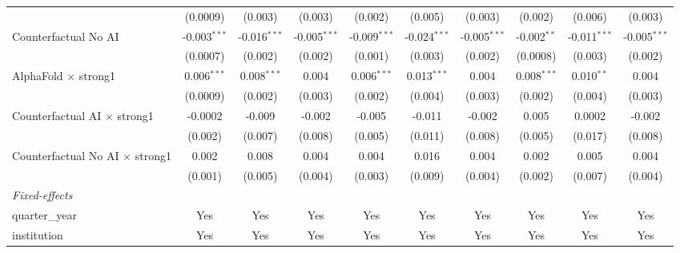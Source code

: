 \begin{tabular}{lccccccccc}
                                          & (0.0009)       & (0.003)        & (0.003)        & (0.002)        & (0.005)        & (0.003)        & (0.002)       & (0.006)        & (0.003)\\   
   Counterfactual No AI                   & -0.003$^{***}$ & -0.016$^{***}$ & -0.005$^{***}$ & -0.009$^{***}$ & -0.024$^{***}$ & -0.005$^{***}$ & -0.002$^{**}$ & -0.011$^{***}$ & -0.005$^{***}$\\   
                                          & (0.0007)       & (0.002)        & (0.002)        & (0.001)        & (0.003)        & (0.002)        & (0.0008)      & (0.003)        & (0.002)\\   
   AlphaFold $\times$ strong1             & 0.006$^{***}$  & 0.008$^{***}$  & 0.004          & 0.006$^{***}$  & 0.013$^{***}$  & 0.004          & 0.008$^{***}$ & 0.010$^{**}$   & 0.004\\   
                                          & (0.0009)       & (0.002)        & (0.003)        & (0.002)        & (0.004)        & (0.003)        & (0.002)       & (0.004)        & (0.003)\\   
   Counterfactual AI $\times$ strong1     & -0.0002        & -0.009         & -0.002         & -0.005         & -0.011         & -0.002         & 0.005         & 0.0002         & -0.002\\   
                                          & (0.002)        & (0.007)        & (0.008)        & (0.005)        & (0.011)        & (0.008)        & (0.005)       & (0.017)        & (0.008)\\   
   Counterfactual No AI $\times$ strong1  & 0.002          & 0.008          & 0.004          & 0.004          & 0.016          & 0.004          & 0.002         & 0.005          & 0.004\\   
                                          & (0.001)        & (0.005)        & (0.004)        & (0.003)        & (0.009)        & (0.004)        & (0.002)       & (0.007)        & (0.004)\\   
   \midrule
   \emph{Fixed-effects}\\
   quarter\_year                          & Yes            & Yes            & Yes            & Yes            & Yes            & Yes            & Yes           & Yes            & Yes\\  
   institution                            & Yes            & Yes            & Yes            & Yes            & Yes            & Yes            & Yes           & Yes            & Yes\\  

\end{tabular}
